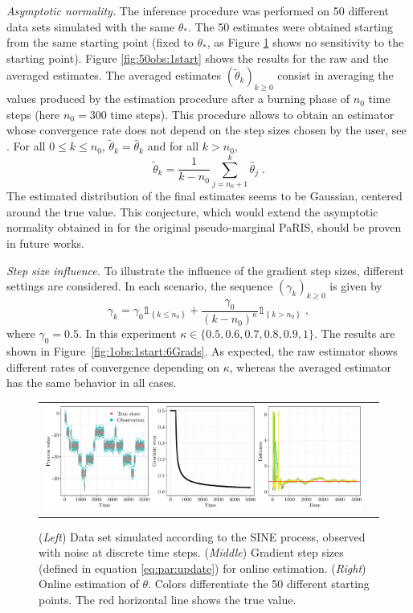 \documentclass[12pt]{article}
\newcommand{\parvec}{\theta}
\def\1{\mathds{1}}
\newcommand{\eqsp}{\;}
\begin{document}
{\em Asymptotic normality.}
The inference procedure was performed on 50 different data sets simulated with the same $\theta_*$. 
The 50 estimates were obtained starting from the same starting point (fixed to $\theta_*$, as Figure \ref{fig:1obs:50start} shows no sensitivity to the starting point). Figure \ref{fig:50obs:1start} shows the results for the raw and the averaged estimates. 
 The averaged estimates $(\widetilde \parvec_k)_{k\geqslant 0}$ consist in averaging the values produced by the estimation procedure after a burning phase of $n_0$ time steps (here $n_0 =300$ time steps). 
 This procedure allows to obtain an estimator whose convergence rate does not depend on the step sizes chosen by the user, see \cite{polyak1992acceleration,kushner1997stochastic}. For all $0 \leqslant k\leqslant n_0$, $\widetilde \parvec_k = \widehat\parvec_k $ and for all $k>n_0$,
\[
\widetilde \parvec_k = \frac{1}{k-n_0}\sum_{j= n_0+1}^k\widehat\parvec_j\eqsp. 
\]
The estimated distribution of the final estimates seems to be Gaussian, centered around the true value. 
This conjecture, which would extend the asymptotic normality obtained in \cite{gloaguen2021pseudo} for the original pseudo-marginal PaRIS, should be proven in future works.
 
{\em Step size influence.} To illustrate the  influence of the gradient step sizes, different settings are considered. 
In each scenario, the sequence $(\gamma_k)_{k\geqslant 0}$ is given by
\begin{equation*}
\gamma_k = \gamma_0 \1_{\left\lbrace k \leq n_0 \right\rbrace} + \frac{\gamma_0}{(k - n_0)^{\kappa}}\1_{\left\lbrace k > n_0 \right\rbrace}\eqsp,
\end{equation*}
where $\gamma_0 = 0.5$. In this experiment $\kappa\in\{0.5,0.6,0.7,0.8,0.9,1\}$.
The results are shown in Figure~\ref{fig:1obs:1start:6Grads}. 
As expected, the raw estimator shows different rates of convergence depending on $\kappa$, whereas the averaged estimator has the same behavior in all cases. 

\begin{figure}
\centering
\begin{tabular}{cc}
\includegraphics[width = \textwidth]{Figure4.pdf}&
\end{tabular} 
\caption{\label{fig:1obs:50start}(\textit{Left}) Data set simulated according to the SINE process, observed with noise at discrete time steps. (\textit{Middle}) Gradient step sizes (defined in equation \eqref{eq:par:update}) for online estimation. (\textit{Right}) Online estimation of $\parvec$. Colors differentiate the 50 different starting points. The red horizontal line shows the true value.}
\end{figure}
\end{document}
